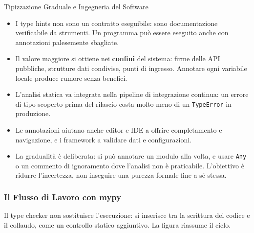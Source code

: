\documentclass[12pt]{extarticle}
\begin{document}
\begin{cbox}{Tipizzazione Graduale e Ingegneria del Software}
\begin{itemize}
    \item I type hints non sono un contratto eseguibile: sono documentazione verificabile da strumenti. Un programma può essere eseguito anche con annotazioni palesemente sbagliate.
    \item Il valore maggiore si ottiene nei \textbf{confini} del sistema: firme delle API pubbliche, strutture dati condivise, punti di ingresso. Annotare ogni variabile locale produce rumore senza benefici.
    \item L'analisi statica va integrata nella pipeline di integrazione continua: un errore di tipo scoperto prima del rilascio costa molto meno di un \texttt{TypeError} in produzione.
    \item Le annotazioni aiutano anche editor e IDE a offrire completamento e navigazione, e i framework a validare dati e configurazioni.
    \item La gradualità è deliberata: si può annotare un modulo alla volta, e usare \texttt{Any} o un commento di ignoramento dove l'analisi non è praticabile. L'obiettivo è ridurre l'incertezza, non inseguire una purezza formale fine a sé stessa.
\end{itemize}
\end{cbox}

\subsubsection{Il Flusso di Lavoro con mypy}

\noindent Il type checker non sostituisce l'esecuzione: si inserisce tra la scrittura del codice e il collaudo, come un controllo statico aggiuntivo. La figura riassume il ciclo.

\begin{center}
\end{center}
\end{document}
